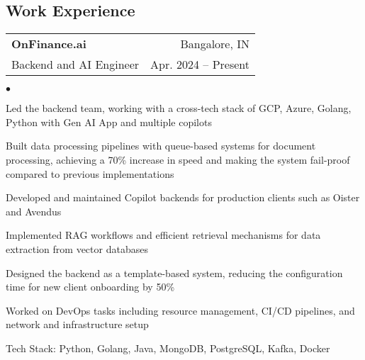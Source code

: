 \documentclass[margin, 11pt]{res}
\makeatletter
\newcommand{\li}{https://linkedin.com/in/harishvadaparty}
\newcommand{\gh}{https://github.com/Harryalways317}
\newcommand{\personalsite}{https://hvadaparty.vercel.app}
\newcommand{\resumeSubheading}[4]{

\begin{tabular*}{1.01\textwidth}{@{\hspace{-4pt}}l @{\extracolsep{\fill}} r}
\textbf{#1} & #2 \\
      {#3} &  {#4}
\end{tabular*}\vspace{-2pt}
}
\newenvironment{list2}{
	\begin{list}{$\bullet$}{%
	    \small
		\setlength{\itemsep}{0in}
		\setlength{\parsep}{0in} \setlength{\parskip}{0in}
		\setlength{\topsep}{0in} \setlength{\partopsep}{0in}
		\setlength{\leftmargin}{0.2in}}}{\end{list}}
\makeatother
\begin{document}
\address{
    \href{https://hvadaparty.vercel.app}{Portfolio} $|$
    \href{mailto:harishvadapartygmail.com}{harishvadaparty@gmail.com} $|$ 
    \href{\li}{linkedin.com/in/harishvadaparty} $|$
    \href{\gh}{github.com/Harryalways317}
}

\begin{resume}

\section{\sc Work Experience}

\vspace{2pt}

\resumeSubheading{{\bf OnFinance.ai}}{Bangalore, IN}
{Backend and AI Engineer}{Apr. 2024 -- Present}

\begin{list2}
\item{Led the backend team, working with a cross-tech stack of GCP, Azure, Golang, Python with Gen AI App and multiple copilots}
\item{Built data processing pipelines with queue-based systems for document processing, achieving a 70\% increase in speed and making the system fail-proof compared to previous implementations}
\item{Developed and maintained Copilot backends for production clients such as Oister and Avendus}
\item{Implemented RAG workflows and efficient retrieval mechanisms for data extraction from vector databases}
\item{Designed the backend as a template-based system, reducing the configuration time for new client onboarding by 50\% }
\item{Worked on DevOps tasks including resource management, CI/CD pipelines, and network and infrastructure setup}
\item{Tech Stack: Python, Golang, Java, MongoDB, PostgreSQL, Kafka, Docker}
\end{list2}


\end{resume}
\end{document}
